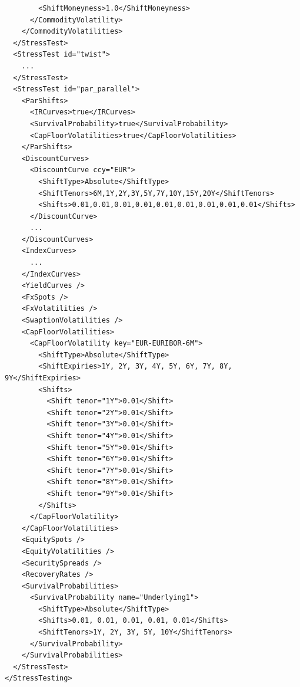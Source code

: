 \begin{longlisting}
\begin{verbatim}
        <ShiftMoneyness>1.0</ShiftMoneyness>
      </CommodityVolatility>
    </CommodityVolatilities>
  </StressTest>
  <StressTest id="twist">
    ...
  </StressTest>
  <StressTest id="par_parallel">
    <ParShifts>
      <IRCurves>true</IRCurves>
      <SurvivalProbability>true</SurvivalProbability>
      <CapFloorVolatilities>true</CapFloorVolatilities>
    </ParShifts>
    <DiscountCurves>
      <DiscountCurve ccy="EUR">
        <ShiftType>Absolute</ShiftType>
        <ShiftTenors>6M,1Y,2Y,3Y,5Y,7Y,10Y,15Y,20Y</ShiftTenors>
        <Shifts>0.01,0.01,0.01,0.01,0.01,0.01,0.01,0.01,0.01</Shifts>
      </DiscountCurve>
      ...
    </DiscountCurves>
    <IndexCurves>
      ...
    </IndexCurves>
    <YieldCurves />
    <FxSpots />
    <FxVolatilities />
    <SwaptionVolatilities />
    <CapFloorVolatilities>
      <CapFloorVolatility key="EUR-EURIBOR-6M">
        <ShiftType>Absolute</ShiftType>
        <ShiftExpiries>1Y, 2Y, 3Y, 4Y, 5Y, 6Y, 7Y, 8Y, 9Y</ShiftExpiries>
        <Shifts>
          <Shift tenor="1Y">0.01</Shift>
          <Shift tenor="2Y">0.01</Shift>
          <Shift tenor="3Y">0.01</Shift>
          <Shift tenor="4Y">0.01</Shift>
          <Shift tenor="5Y">0.01</Shift>
          <Shift tenor="6Y">0.01</Shift>
          <Shift tenor="7Y">0.01</Shift>
          <Shift tenor="8Y">0.01</Shift>
          <Shift tenor="9Y">0.01</Shift>
        </Shifts>
      </CapFloorVolatility>
    </CapFloorVolatilities>
    <EquitySpots />
    <EquityVolatilities />
    <SecuritySpreads />
    <RecoveryRates />
    <SurvivalProbabilities>
      <SurvivalProbability name="Underlying1">
        <ShiftType>Absolute</ShiftType>
        <Shifts>0.01, 0.01, 0.01, 0.01, 0.01</Shifts>
        <ShiftTenors>1Y, 2Y, 3Y, 5Y, 10Y</ShiftTenors>
      </SurvivalProbability>
    </SurvivalProbabilities>
  </StressTest>
</StressTesting>
  \end{verbatim}
\caption{Stress configuration}
\label{lst:stress_config}
\end{longlisting}


